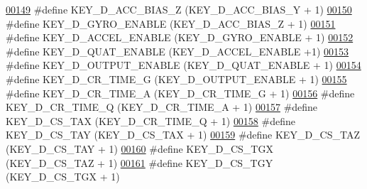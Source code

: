 \begin{DoxyCode}
\hypertarget{dmp_key_8h_source.tex_l00149}{}\hyperlink{dmp_key_8h_aee86cca74b68b4f54f8e939a4419f7b4}{00149} \textcolor{preprocessor}{#define KEY\_D\_ACC\_BIAS\_Z                (KEY\_D\_ACC\_BIAS\_Y + 1)}
\hypertarget{dmp_key_8h_source.tex_l00150}{}\hyperlink{dmp_key_8h_a0dd3a972304419a5326d112028fd83a6}{00150} \textcolor{preprocessor}{#define KEY\_D\_GYRO\_ENABLE               (KEY\_D\_ACC\_BIAS\_Z + 1)}
\hypertarget{dmp_key_8h_source.tex_l00151}{}\hyperlink{dmp_key_8h_ad0155ccde405af83a10eb2793b33b56a}{00151} \textcolor{preprocessor}{#define KEY\_D\_ACCEL\_ENABLE              (KEY\_D\_GYRO\_ENABLE + 1)}
\hypertarget{dmp_key_8h_source.tex_l00152}{}\hyperlink{dmp_key_8h_a6fa7c9b483cce82b1ec3a36fe5d0b9ab}{00152} \textcolor{preprocessor}{#define KEY\_D\_QUAT\_ENABLE               (KEY\_D\_ACCEL\_ENABLE +1)}
\hypertarget{dmp_key_8h_source.tex_l00153}{}\hyperlink{dmp_key_8h_ae710188d91f576d2cca5e9a492cb853d}{00153} \textcolor{preprocessor}{#define KEY\_D\_OUTPUT\_ENABLE             (KEY\_D\_QUAT\_ENABLE + 1)}
\hypertarget{dmp_key_8h_source.tex_l00154}{}\hyperlink{dmp_key_8h_afa242687c09ebc82383746057ddb3350}{00154} \textcolor{preprocessor}{#define KEY\_D\_CR\_TIME\_G                 (KEY\_D\_OUTPUT\_ENABLE + 1)}
\hypertarget{dmp_key_8h_source.tex_l00155}{}\hyperlink{dmp_key_8h_ac676932e91ed7a745409c566be915de1}{00155} \textcolor{preprocessor}{#define KEY\_D\_CR\_TIME\_A                 (KEY\_D\_CR\_TIME\_G + 1)}
\hypertarget{dmp_key_8h_source.tex_l00156}{}\hyperlink{dmp_key_8h_a992ffb967c87f52515786285afd0294c}{00156} \textcolor{preprocessor}{#define KEY\_D\_CR\_TIME\_Q                 (KEY\_D\_CR\_TIME\_A + 1)}
\hypertarget{dmp_key_8h_source.tex_l00157}{}\hyperlink{dmp_key_8h_af1885d9c431f01f338c8ba949c3b5ab7}{00157} \textcolor{preprocessor}{#define KEY\_D\_CS\_TAX                    (KEY\_D\_CR\_TIME\_Q + 1)}
\hypertarget{dmp_key_8h_source.tex_l00158}{}\hyperlink{dmp_key_8h_ac8ea06ca1df86193290ed973995b600b}{00158} \textcolor{preprocessor}{#define KEY\_D\_CS\_TAY                    (KEY\_D\_CS\_TAX + 1)}
\hypertarget{dmp_key_8h_source.tex_l00159}{}\hyperlink{dmp_key_8h_aca381a83beb9fe70bc1f691f46af90da}{00159} \textcolor{preprocessor}{#define KEY\_D\_CS\_TAZ                    (KEY\_D\_CS\_TAY + 1)}
\hypertarget{dmp_key_8h_source.tex_l00160}{}\hyperlink{dmp_key_8h_a0cc1bbdb7c88767dde6752df7eceb9a1}{00160} \textcolor{preprocessor}{#define KEY\_D\_CS\_TGX                    (KEY\_D\_CS\_TAZ + 1)}
\hypertarget{dmp_key_8h_source.tex_l00161}{}\hyperlink{dmp_key_8h_aaf379b295a074e258f3b2830899c8dd1}{00161} \textcolor{preprocessor}{#define KEY\_D\_CS\_TGY                    (KEY\_D\_CS\_TGX + 1)}

\end{DoxyCode}
